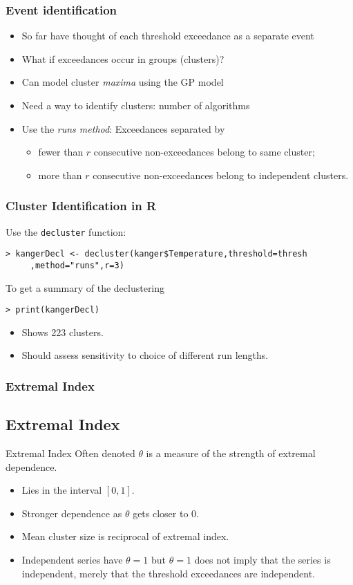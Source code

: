 \documentclass[dvipsnames]{beamer}
\begin{document}
\begin{frame}
\frametitle{Event identification}
\begin{itemize}
\item
So far have thought of each threshold exceedance as a separate event
\item
What if exceedances occur in groups (clusters)?
\item
Can model cluster {\it maxima} using the GP model
\item
Need a way to identify clusters: number of algorithms
\item
Use the {\it runs method}: Exceedances separated by 
\begin{itemize}
\item
fewer than $r$ consecutive non-exceedances belong to same cluster;
\item
more than $r$ consecutive non-exceedances belong to independent clusters.
\end{itemize}
\end{itemize}
\end{frame}

\begin{frame}[fragile]
\frametitle{Cluster Identification in \textsf{R}}
Use the \texttt{decluster} function:
\begin{verbatim}
> kangerDecl <- decluster(kanger$Temperature,threshold=thresh
     ,method="runs",r=3)
\end{verbatim}
To get a summary of the declustering
\begin{verbatim}
> print(kangerDecl)
\end{verbatim}

\begin{itemize}
\item
Shows 223 clusters. 
\item
Should assess sensitivity to choice of different run lengths.
\end{itemize}
\end{frame}

\begin{frame}[fragile]
\frametitle{Extremal Index}
\subsection{Extremal Index}
\begin{block}{Extremal Index}
Often denoted $\theta$ is a measure of the strength of extremal dependence. 
\begin{itemize}
\item
Lies in the interval $[0,1]$. 
\item
Stronger dependence as $\theta$ gets closer to 0.
\item
Mean cluster size is reciprocal of extremal index.
\item
Independent series have $\theta=1$ but $\theta=1$ does not imply that the series is independent, merely that the threshold exceedances are independent. 
\end{itemize}
\end{block}
\end{frame}
\end{document}
